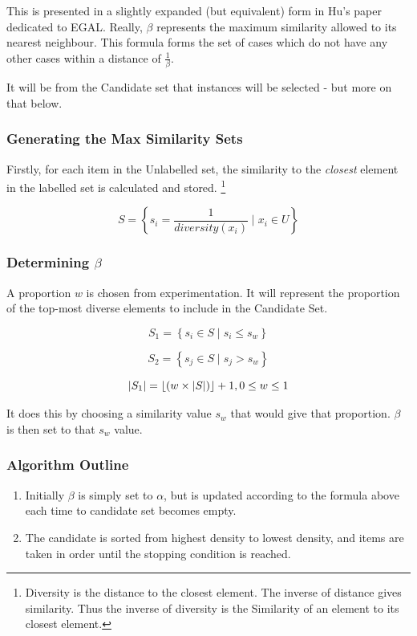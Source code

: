 \documentclass[a4paper,11pt]{report}
\begin{document}
This is presented in a slightly expanded (but equivalent) form in Hu's paper dedicated to EGAL\cite{Hu2010}. Really, $\beta$ represents the maximum similarity allowed to its nearest neighbour. This formula forms the set of cases which do not have any other cases within a distance of $\frac{1}{\beta}$.

It will be from the Candidate set that instances will be selected - but more on that below.

\subsubsection{Generating the Max Similarity Sets}

Firstly, for each item in the Unlabelled set, the similarity to the \emph{closest} element in the labelled set is calculated and stored. \footnote{Diversity is the distance to the closest element. The inverse of distance gives similarity. Thus the inverse of diversity is the Similarity of an element to its closest element.}

\[
S=\left\{ s_{i}=\frac{1}{diversity(x_{i})}\mid x_{i}\in U\right\} 
\]

\subsubsection{Determining $\beta$}
A proportion $w$ is chosen from experimentation. It will represent the proportion of the top-most diverse elements to include in the Candidate Set.

\[
S_{1}=\left\{ s_{i}\in S\mid s_{i}\leq s_{w}\right\} 
\]

\[
S_{2}=\left\{ s_{j}\in S\mid s_{j}>s_{w}\right\} 
\]

\[
\left|S_{1}\right|=\left\lfloor \left(w\times\left|S\right|\right)\right\rfloor +1,\hphantom{}0\leq w\leq 1
\]

It does this by choosing a similarity value $s_{w}$ that would give that proportion. $\beta$ is then set to that $s_{w}$ value.

\subsubsection{Algorithm Outline}
\begin{enumerate}
	\item Initially $\beta$ is simply set to $\alpha$, but is updated according to the formula above each time to candidate set becomes empty.
	\item The candidate is sorted from highest density to lowest density, and items are taken in order until the stopping condition is reached.
\end{enumerate}
\end{document}
